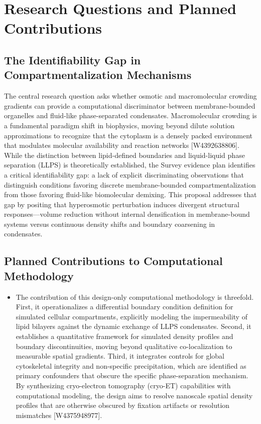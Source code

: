 \documentclass[conference]{IEEEtran}
\begin{document}
\section{Research Questions and Planned Contributions}
\subsection{The Identifiability Gap in Compartmentalization Mechanisms}
The central research question asks whether osmotic and macromolecular crowding gradients can provide a computational discriminator between membrane-bounded organelles and fluid-like phase-separated condensates. Macromolecular crowding is a fundamental paradigm shift in biophysics, moving beyond dilute solution approximations to recognize that the cytoplasm is a densely packed environment that modulates molecular availability and reaction networks [W4392638806]. While the distinction between lipid-defined boundaries and liquid-liquid phase separation (LLPS) is theoretically established, the Survey evidence plan identifies a critical identifiability gap: a lack of explicit discriminating observations that distinguish conditions favoring discrete membrane-bounded compartmentalization from those favoring fluid-like biomolecular demixing. This proposal addresses that gap by positing that hyperosmotic perturbation induces divergent structural responses---volume reduction without internal densification in membrane-bound systems versus continuous density shifts and boundary coarsening in condensates.~\cite{cite_42ed299a53990c06}

\subsection{Planned Contributions to Computational Methodology}
\begin{itemize}
\item The contribution of this design-only computational methodology is threefold. First, it operationalizes a differential boundary condition definition for simulated cellular compartments, explicitly modeling the impermeability of lipid bilayers against the dynamic exchange of LLPS condensates. Second, it establishes a quantitative framework for simulated density profiles and boundary discontinuities, moving beyond qualitative co-localization to measurable spatial gradients. Third, it integrates controls for global cytoskeletal integrity and non-specific precipitation, which are identified as primary confounders that obscure the specific phase-separation mechanism. By synthesizing cryo-electron tomography (cryo-ET) capabilities with computational modeling, the design aims to resolve nanoscale spatial density profiles that are otherwise obscured by fixation artifacts or resolution mismatches [W4375948977].
\end{itemize}
\end{document}
